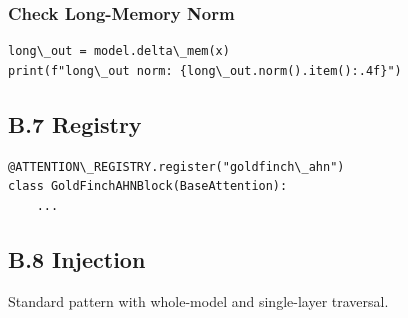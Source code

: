 \subsubsection{Check Long-Memory Norm}

\begin{lstlisting}
long\_out = model.delta\_mem(x)
print(f"long\_out norm: {long\_out.norm().item():.4f}")
\end{lstlisting}

\subsection{B.7 Registry}

\begin{lstlisting}
@ATTENTION\_REGISTRY.register("goldfinch\_ahn")
class GoldFinchAHNBlock(BaseAttention):
    ...
\end{lstlisting}

\subsection{B.8 Injection}

Standard pattern with whole-model and single-layer traversal.

